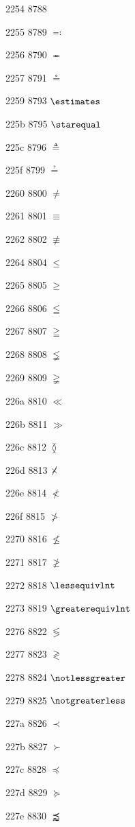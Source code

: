 \documentclass[11pt]{article}
\begin{document}
2254 8788 \coloneq

2255 8789 \ensuremath{\eqcolon}

2256 8790 \ensuremath{\eqcirc}

2257 8791 \ensuremath{\circeq}

2259 8793 \ensuremath{\estimates}

225b 8795 \ensuremath{\starequal}

225c 8796 \ensuremath{\triangleq}

225f 8799 \ensuremath{\questeq}

2260 8800 \ensuremath{\ne}

2261 8801 \ensuremath{\equiv}

2262 8802 \ensuremath{\nequiv}

2264 8804 \ensuremath{\leq}

2265 8805 \ensuremath{\geq}

2266 8806 \ensuremath{\leqq}

2267 8807 \ensuremath{\geqq}

2268 8808 \ensuremath{\lneqq}

2269 8809 \ensuremath{\gneqq}

226a 8810 \ensuremath{\ll}

226b 8811 \ensuremath{\gg}

226c 8812 \ensuremath{\between}

226d 8813 \ensuremath{\not\kern-0.3em\times}

226e 8814 \ensuremath{\nless}

226f 8815 \ensuremath{\ngtr}

2270 8816 \ensuremath{\nleq}

2271 8817 \ensuremath{\ngeq}

2272 8818 \ensuremath{\lessequivlnt}

2273 8819 \ensuremath{\greaterequivlnt}

2276 8822 \ensuremath{\lessgtr}

2277 8823 \ensuremath{\gtrless}

2278 8824 \ensuremath{\notlessgreater}

2279 8825 \ensuremath{\notgreaterless}

227a 8826 \ensuremath{\prec}

227b 8827 \ensuremath{\succ}

227c 8828 \ensuremath{\preccurlyeq}

227d 8829 \ensuremath{\succcurlyeq}

227e 8830 \ensuremath{\precapprox}
\end{document}
